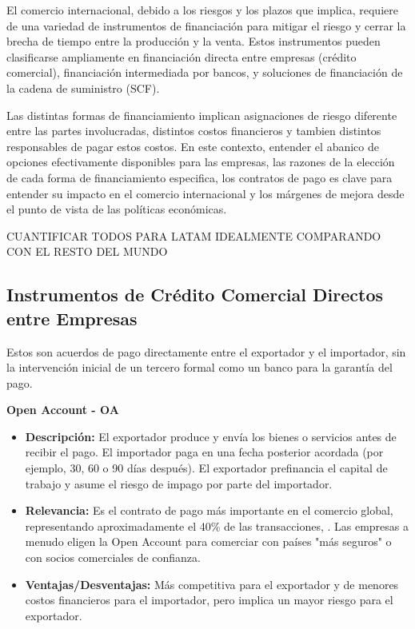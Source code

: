 \documentclass[11pt]{article}
\begin{document}
El comercio internacional, debido a los riesgos y los plazos que implica, requiere de una variedad de instrumentos de financiación para mitigar el riesgo y cerrar la brecha de tiempo entre la producción y la venta. Estos instrumentos pueden clasificarse ampliamente en financiación directa entre empresas (crédito comercial), financiación intermediada por bancos, y soluciones de financiación de la cadena de suministro (SCF). 

Las distintas formas de financiamiento implican asignaciones de riesgo diferente entre las partes involucradas, distintos costos financieros y tambien distintos responsables de pagar estos costos.
En este contexto, entender el abanico de opciones efectivamente disponibles para las empresas, las razones de la elección de cada forma de financiamiento especifica, los contratos de pago es clave para entender su impacto en el comercio internacional y los márgenes de mejora desde el punto de vista de las políticas económicas. 

CUANTIFICAR TODOS PARA LATAM IDEALMENTE COMPARANDO CON EL RESTO DEL MUNDO


\subsection{Instrumentos de Cr\'edito Comercial Directos entre Empresas}

Estos son acuerdos de pago directamente entre el exportador y el importador, sin la intervención inicial de un tercero formal como un banco para la garantía del pago.

\textbf{Open Account - OA}
\begin{itemize}
\item \textbf{Descripción:} El exportador produce y envía los bienes o servicios antes de recibir el pago. El importador paga en una fecha posterior acordada (por ejemplo, 30, 60 o 90 días después). El exportador prefinancia el capital de trabajo y asume el riesgo de impago por parte del importador.

\item \textbf{Relevancia:} Es el contrato de pago más importante en el comercio global, representando aproximadamente el 40\% de las transacciones, \cite{IMF2009}. Las empresas a menudo eligen la Open Account para comerciar con países "más seguros" o con socios comerciales de confianza.

\item \textbf{Ventajas/Desventajas:} Más competitiva para el exportador y de menores costos financieros para el importador, pero implica un mayor riesgo para el exportador.
\end{itemize}
\end{document}
